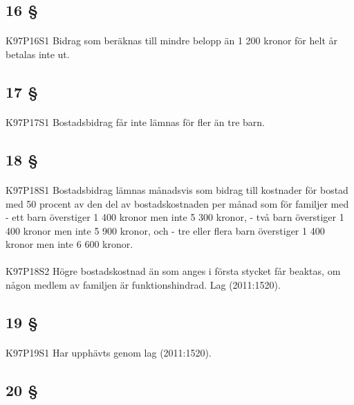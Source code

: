 \documentclass[a4paper,notitlepage,openany,10pt]{book}
\begin{document}
\subsection*{16 §}
\paragraph*{}
{\tiny K97P16S1}
Bidrag som beräknas till mindre belopp än 1 200 kronor för helt år betalas inte ut.
\subsection*{17 §}
\paragraph*{}
{\tiny K97P17S1}
Bostadsbidrag får inte lämnas för fler än tre barn.
\subsection*{18 §}
\paragraph*{}
{\tiny K97P18S1}
Bostadsbidrag lämnas månadsvis som bidrag till kostnader för bostad med 50 procent av den del av bostadskostnaden per månad som för familjer med
\newline - ett barn överstiger 1 400 kronor men inte 5 300 kronor,
\newline - två barn överstiger 1 400 kronor men inte 5 900 kronor, och
\newline - tre eller flera barn överstiger 1 400 kronor men inte 6 600 kronor.
\paragraph*{}
{\tiny K97P18S2}
Högre bostadskostnad än som anges i första stycket får beaktas, om någon medlem av familjen är funktionshindrad.
Lag (2011:1520).
\subsection*{19 §}
\paragraph*{}
{\tiny K97P19S1}
Har upphävts genom
lag (2011:1520).
\subsection*{20 §}
\end{document}
